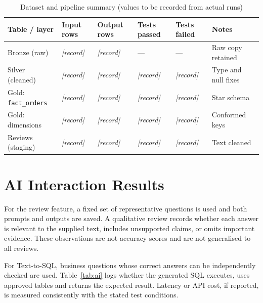 \documentclass[12pt,a4paper]{report}
\newcommand{\ph}[1]{\textit{[#1]}}
\begin{document}
\begin{table}[htbp]
\centering
\caption{Dataset and pipeline summary (values to be recorded from actual runs)}
\label{tab:pipeline}
\small
\setlength{\tabcolsep}{4pt}
\begin{tabular}{@{}p{2.7cm}p{2.2cm}p{2.2cm}p{1.9cm}p{1.9cm}p{2.5cm}@{}}
\toprule
\textbf{Table / layer} & \textbf{Input rows} & \textbf{Output rows} & \textbf{Tests passed} & \textbf{Tests failed} & \textbf{Notes} \\
\midrule
Bronze (raw) & \ph{record} & \ph{record} & --- & --- & Raw copy retained \\
Silver (cleaned) & \ph{record} & \ph{record} & \ph{record} & \ph{record} & Type and null fixes \\
Gold: \texttt{fact\_orders} & \ph{record} & \ph{record} & \ph{record} & \ph{record} & Star schema \\
Gold: dimensions & \ph{record} & \ph{record} & \ph{record} & \ph{record} & Conformed keys \\
Reviews (staging) & \ph{record} & \ph{record} & \ph{record} & \ph{record} & Text cleaned \\
\bottomrule
\end{tabular}
\end{table}

\section{AI Interaction Results}
For the review feature, a fixed set of representative questions is used and both prompts and outputs are saved. A qualitative review records whether each answer is relevant to the supplied text, includes unsupported claims, or omits important evidence. These observations are not accuracy scores and are not generalised to all reviews.

For Text-to-SQL, business questions whose correct answers can be independently checked are used. Table~\ref{tab:ai} logs whether the generated SQL executes, uses approved tables and returns the expected result. Latency or API cost, if reported, is measured consistently with the stated test conditions.
\end{document}
